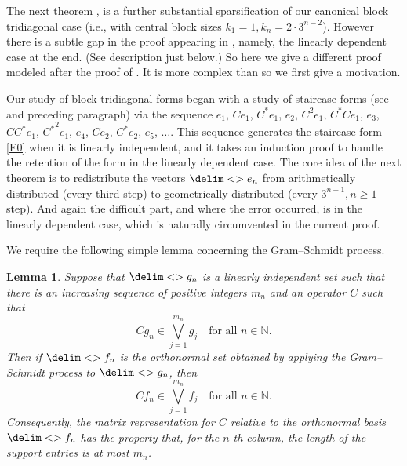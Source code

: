\documentclass[10pt,reqno]{amsart}
\newtheorem{lemma}[theorem]{Lemma}
\theoremstyle{remark}
\newcommand{\seq}{\delim<>}
\numberwithin{equation}{section}
\begin{document}
The next theorem \cite[Theorem 20.8]{PPW-2020-TmloVLOt}, is a further substantial sparsification of our canonical block tridiagonal  case (i.e., with central block sizes $k_1=1, k_n = 2\cdot 3^{n-2}$).
However there is a subtle gap in the proof appearing in \cite{PPW-2020-TmloVLOt}, namely, the linearly dependent case at the end.
(See description just below.)
So here we give a different proof modeled after the proof of \cite[Theorem 2]{Wei-1980-IEOT}.
It is more complex than \cite[Theorem 20.8]{PPW-2020-TmloVLOt} so we first give a motivation.

Our study of block tridiagonal forms began with a study of staircase forms (see  and preceding paragraph) via the sequence $e_1$, $Ce_1$, $C^*e_1$, $e_2$, $C^2e_1$, $C^*Ce_1$, $e_3$, $CC^*e_1$, ${C^*}^2e_1$, $e_4$, $Ce_2$, $C^*e_2$, $e_5$, $\dots$.
This sequence generates the staircase form \eqref{E0} when it is linearly independent, and it takes an induction proof to handle the retention of the form in the linearly dependent case.
The core idea of the next theorem is to redistribute the vectors $\seq{e_n}$ from arithmetically distributed (every third step) to geometrically distributed (every $3^{n-1}, n \ge 1$ step).
And again the difficult part, and where the error occurred, is in the linearly dependent case, which is naturally circumvented in the current proof.

We require the following simple lemma concerning the Gram--Schmidt process.

\begin{lemma}
  \label{lem:key-collapsing-lemma}
  Suppose that $\seq{g_n}$ is a linearly independent set such that there is an increasing sequence of positive integers $m_n$ and an operator $C$ such that
  \begin{equation*}
    C g_n \in \bigvee_{j=1}^{m_n} g_j \quad\text{for all } n \in \mathbb{N}.
  \end{equation*}
  Then if $\seq{f_n}$ is the orthonormal set obtained by applying the Gram--Schmidt process to $\seq{g_n}$, then
  \begin{equation*}
    C f_n \in \bigvee_{j=1}^{m_n} f_j \quad\text{for all } n \in \mathbb{N}.
  \end{equation*}
  Consequently, the matrix representation for $C$ relative to the orthonormal basis $\seq{f_n}$ has the property that, for the $n$-th column, the length of the support entries is at most $m_n$.
\end{lemma}
\end{document}
